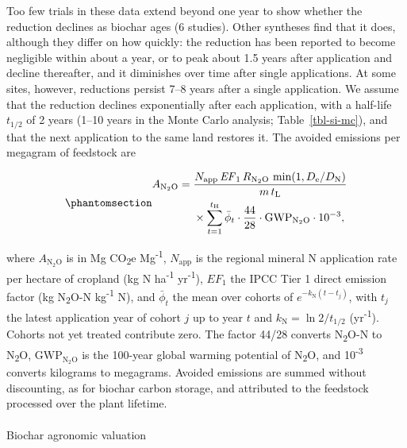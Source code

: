 \documentclass[
  letterpaper,
  twoside,
  twocolumn,
  9pt]{article}
\makeatletter
\let\oldparagraph\paragraph
\renewcommand{\paragraph}{
    \@ifstar
      \xxxParagraphStar
      \xxxParagraphNoStar
  }
\newcommand{\xxxParagraphStar}[1]{\oldparagraph*{#1}\mbox{}}
\newcommand{\xxxParagraphNoStar}[1]{\oldparagraph{#1}\mbox{}}
\makeatother
\begin{document}
Too few trials in these data extend beyond one year to show whether the
reduction declines as biochar ages (6 studies). Other syntheses find
that it does, although they differ on how quickly: the reduction has
been reported to become negligible within about a
year,\citep{borchard2019, liu2020n2o} or to peak about 1.5 years after
application and decline thereafter,\citep{kaur2023} and it diminishes
over time after single applications.\citep{yang2025biochar} At some
sites, however, reductions persist 7--8 years after a single
application.\citep{guo2023legacy, zhang2026paddy} We assume that the
reduction declines exponentially after each application, with a
half-life \(t_{1/2}\) of 2 years (1--10 years in the Monte Carlo
analysis; Table~\ref{tbl-si-mc}), and that the next application to the
same land restores it. The avoided emissions per megagram of feedstock
are

\begin{equation}\phantomsection\label{eq-n2o}{\begin{aligned}
A_{\mathrm{N_2O}} = {} & \frac{N_{\mathrm{app}}\, \mathit{EF}_1\, R_{\mathrm{N_2O}}\, \min\!\left(1, D_{\mathrm{e}}/D_{\mathrm{N}}\right)}{m\, t_{\mathrm{L}}} \\
& \times \sum_{t=1}^{t_{\mathrm{H}}} \bar{\phi}_t \cdot \frac{44}{28} \cdot \mathrm{GWP}_{\mathrm{N_2O}} \cdot 10^{-3},
\end{aligned}}\end{equation}

where \(A_{\mathrm{N_2O}}\) is in Mg CO\textsubscript{2}e
Mg\textsuperscript{-1}, \(N_{\mathrm{app}}\) is the regional mineral N
application rate per hectare of cropland (kg N ha\textsuperscript{-1}
yr\textsuperscript{-1}), \(\mathit{EF}_1\) the IPCC Tier 1 direct
emission factor (kg N\textsubscript{2}O-N kg\textsuperscript{-1}
N),\citep{ipcc2019} and \(\bar{\phi}_t\) the mean over cohorts of
\(e^{-k_{\mathrm{N}} (t - t_j)}\), with \(t_j\) the latest application
year of cohort \(j\) up to year \(t\) and
\(k_{\mathrm{N}} = \ln 2 / t_{1/2}\) (yr\textsuperscript{-1}). Cohorts
not yet treated contribute zero. The factor 44/28 converts
N\textsubscript{2}O-N to N\textsubscript{2}O,
\(\mathrm{GWP}_{\mathrm{N_2O}}\) is the 100-year global warming
potential of N\textsubscript{2}O,\citep{forster2021} and
10\textsuperscript{-3} converts kilograms to megagrams. Avoided
emissions are summed without discounting, as for biochar carbon storage,
and attributed to the feedstock processed over the plant lifetime.

\paragraph{Biochar agronomic
valuation}\label{biochar-agronomic-valuation}
\end{document}
